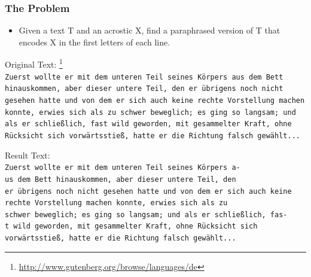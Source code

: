 \documentclass{beamer}
\begin{document}
\begin{frame}
\frametitle{The Problem}
\begin{itemize}
\item Given a text T and an acrostic X, find a paraphrased version of T that encodes X in the first letters of each line.
\end{itemize}
Original Text: \footnote{\tiny \url{http://www.gutenberg.org/browse/languages/de}} \\
\texttt{\tiny Zuerst wollte er mit dem unteren Teil seines Körpers aus dem Bett \\
hinauskommen, aber dieser untere Teil, den er übrigens noch nicht \\
gesehen hatte und von dem er sich auch keine rechte Vorstellung machen \\
konnte, erwies sich als zu schwer beweglich; es ging so langsam; und \\
als er schließlich, fast wild geworden, mit gesammelter Kraft, ohne \\
Rücksicht sich vorwärtsstieß, hatte er die Richtung falsch gewählt...\\}

Result Text: \\

\texttt{\scriptsize{Z}\tiny uerst wollte er mit dem unteren Teil seines Körpers a-\\
\scriptsize{u}\tiny s dem Bett hinauskommen, aber dieser untere Teil, den\\
\scriptsize{e}\tiny r übrigens noch nicht gesehen hatte und von dem er sich auch keine\\
\scriptsize{r}\tiny echte Vorstellung machen konnte, erwies sich als zu\\
\scriptsize{s}\tiny chwer beweglich; es ging so langsam; und als er schließlich, fas-\\
\scriptsize{t}\tiny \ wild geworden, mit gesammelter Kraft, ohne Rücksicht sich\\
vorwärtsstieß, hatte er die Richtung falsch gewählt...\\}
\end{frame}
\end{document}
